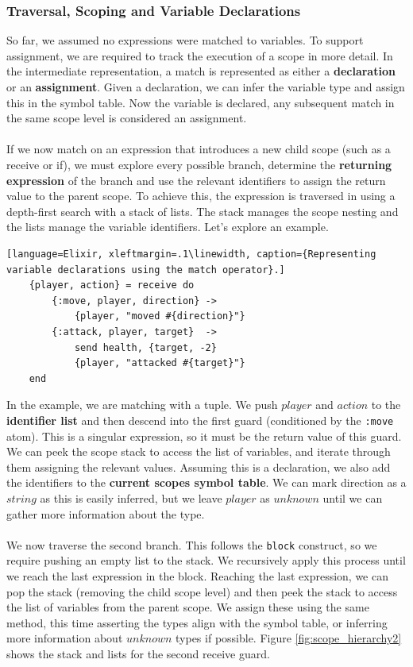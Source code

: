 \subsubsection{Traversal, Scoping and Variable Declarations}
So far, we assumed no expressions were matched to variables. To support assignment, we are required to track the execution of a scope in more detail. In the intermediate representation, a match is represented as either a \textbf{declaration} or an \textbf{assignment}. Given a declaration, we can infer the variable type and assign this in the symbol table. Now the variable is declared, any subsequent match in the same scope level is considered an assignment.
\\ \\
If we now match on an expression that introduces a new child scope (such as a receive or if), we must explore every possible branch, determine the \textbf{returning expression} of the branch and use the relevant identifiers to assign the return value to the parent scope. To achieve this, the expression is traversed in using a depth-first search with a stack of lists. The stack manages the scope nesting and the lists manage the variable identifiers. Let's explore an example.
\begin{lstlisting}[language=Elixir, xleftmargin=.1\linewidth, caption={Representing variable declarations using the match operator}.]
    {player, action} = receive do
        {:move, player, direction} -> 
            {player, "moved #{direction}"}
        {:attack, player, target}  -> 
            send health, {target, -2}
            {player, "attacked #{target}"}
    end
\end{lstlisting}
In the example, we are matching with a tuple. We push $player$ and $action$ to the \textbf{identifier list} and then descend into the first guard (conditioned by the \texttt{:move} atom). This is a singular expression, so it must be the return value of this guard. We can peek the scope stack to access the list of variables, and iterate through them assigning the relevant values. Assuming this is a declaration, we also add the identifiers to the \textbf{current scopes symbol table}. We can mark direction as a $string$ as this is easily inferred, but we leave $player$ as $unknown$ until we can gather more information about the type. 
\\ \\
We now traverse the second branch. This follows the \texttt{block} construct, so we require pushing an empty list to the stack. We recursively apply this process until we reach the last expression in the block. Reaching the last expression, we can pop the stack (removing the child scope level) and then peek the stack to access the list of variables from the parent scope. We assign these using the same method, this time asserting the types align with the symbol table, or inferring more information about $unknown$ types if possible. Figure \ref{fig:scope_hierarchy2} shows the stack and lists for the second receive guard.\\ \\
